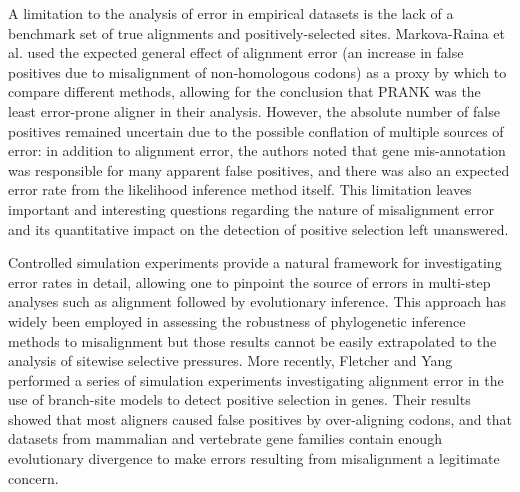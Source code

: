 \documentclass{mbe}
\begin{document}
A limitation to the analysis of error in empirical datasets is the
lack of a benchmark set of true alignments and positively-selected
sites. Markova-Raina et al. \citeyearpar{Markova-Raina2011High} used
the expected general effect of alignment error (an increase in false
positives due to misalignment of non-homologous codons) as a proxy by
which to compare different methods, allowing for the conclusion that
PRANK was the least error-prone aligner in their analysis. However,
the absolute number of false positives remained uncertain due to the
possible conflation of multiple sources of error: in addition to
alignment error, the authors noted that gene mis-annotation was
responsible for many apparent false positives, and there was also an
expected error rate from the likelihood inference method itself. This
limitation leaves important and interesting questions regarding the
nature of misalignment error and its quantitative impact on the
detection of positive selection left unanswered.

Controlled simulation experiments provide a natural framework for
investigating error rates in detail, allowing one to pinpoint the
source of errors in multi-step analyses such as alignment followed by
evolutionary inference. This approach has widely been employed in
assessing the robustness of phylogenetic inference methods to
misalignment
\citep{Dwivedi2009Phylogenetic,Ogden2006Multiple,Loytynoja2008PhylogenyAware}
but those results cannot be easily extrapolated to the analysis of
sitewise selective pressures. More recently, Fletcher and Yang
\citeyearpar{Fletcher2010Effect} performed a series of simulation
experiments investigating alignment error in the use of branch-site
models to detect positive selection in genes. Their results showed
that most aligners caused false positives by over-aligning codons, and
that datasets from mammalian and vertebrate gene families contain
enough evolutionary divergence to make errors resulting from
misalignment a legitimate concern.
\end{document}
